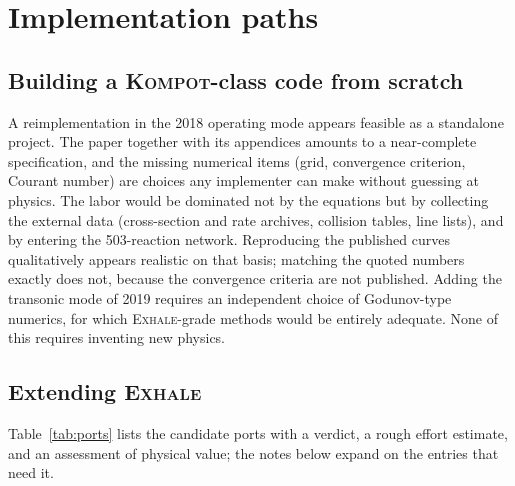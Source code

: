 \documentclass{my_memo}
\newcommand{\EXHALE}{\textsc{Exhale}}
\newcommand{\Kompot}{\textsc{Kompot}}
\begin{document}
\section{Implementation paths}

\subsection{Building a \Kompot-class code from scratch}

A reimplementation in the 2018 operating mode appears feasible as a standalone project. The paper
together with its appendices amounts to a near-complete specification, and the missing numerical
items (grid, convergence criterion, Courant number) are choices any implementer can make without
guessing at physics. The labor would be dominated not by the equations but by collecting the
external data (cross-section and rate archives, collision tables, line lists), and by
entering the 503-reaction network. Reproducing the published curves qualitatively appears
realistic on that basis; matching the quoted numbers exactly does not, because the convergence
criteria are not published. Adding the transonic mode of 2019 requires an independent choice of
Godunov-type numerics, for which \EXHALE-grade methods would be entirely adequate. None of this
requires inventing new physics.

\subsection{Extending \EXHALE}

Table~\ref{tab:ports} lists the candidate ports with a verdict, a rough effort estimate, and an
assessment of physical value; the notes below expand on the entries that need it.
\end{document}
